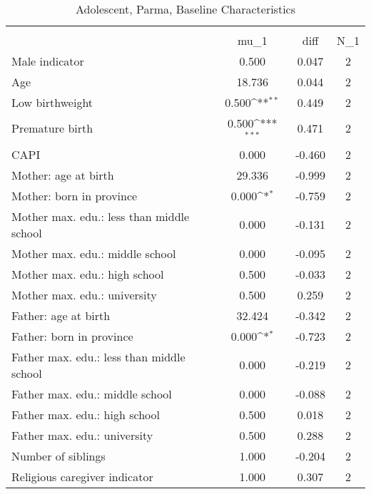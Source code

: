 \begin{table}[htbp]\centering
\def\sym#1{\ifmmode^{#1}\else\(^{#1}\)\fi}
\caption{Adolescent, Parma, Baseline Characteristics}
\begin{tabular}{l*{1}{ccc}}
\toprule
                    &\multicolumn{3}{c}{}                           \\
                    &        mu\_1         &        diff&         N\_1\\
\midrule
Male indicator      &       0.500         &       0.047&           2\\
Age                 &      18.736         &       0.044&           2\\
Low birthweight     &       0.500\sym{**} &       0.449&           2\\
Premature birth     &       0.500\sym{***}&       0.471&           2\\
CAPI                &       0.000         &      -0.460&           2\\
Mother: age at birth&      29.336         &      -0.999&           2\\
Mother: born in province&       0.000\sym{*}  &      -0.759&           2\\
Mother max. edu.: less than middle school&       0.000         &      -0.131&           2\\
Mother max. edu.: middle school&       0.000         &      -0.095&           2\\
Mother max. edu.: high school&       0.500         &      -0.033&           2\\
Mother max. edu.: university&       0.500         &       0.259&           2\\
Father: age at birth&      32.424         &      -0.342&           2\\
Father: born in province&       0.000\sym{*}  &      -0.723&           2\\
Father max. edu.: less than middle school&       0.000         &      -0.219&           2\\
Father max. edu.: middle school&       0.000         &      -0.088&           2\\
Father max. edu.: high school&       0.500         &       0.018&           2\\
Father max. edu.: university&       0.500         &       0.288&           2\\
Number of siblings  &       1.000         &      -0.204&           2\\
Religious caregiver indicator&       1.000         &       0.307&           2\\

\end{tabular}
\end{table}
